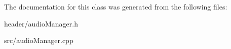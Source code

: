The documentation for this class was generated from the following files\+:\begin{DoxyCompactItemize}
\item 
header/audio\+Manager.\+h\item 
src/audio\+Manager.\+cpp\end{DoxyCompactItemize}
